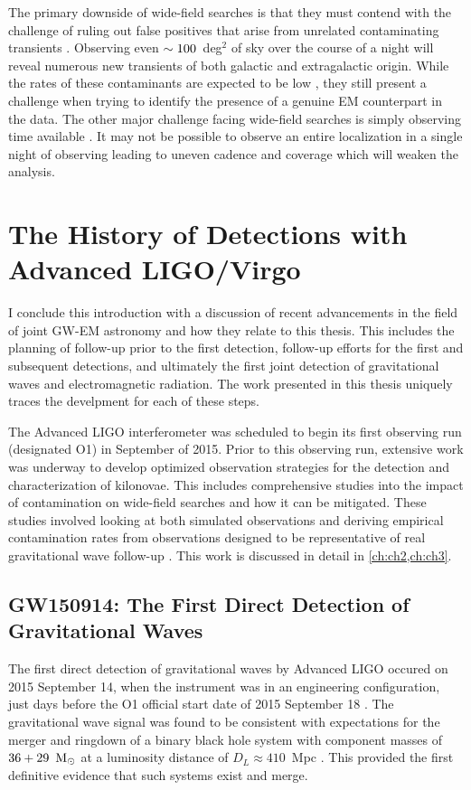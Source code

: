 The primary downside of wide-field searches is that they must contend with the challenge of ruling out false positives that arise from unrelated contaminating transients \citep{CowpBerger15}. Observing even $\sim100$~deg$^2$ of sky over the course of a night will reveal numerous new transients of both galactic and extragalactic origin. While the rates of these contaminants are expected to be low \citep[$\mathcal{R} \apx 2$ events per deg$^2$][]{Cowp+17}, they still present a challenge when trying to identify the presence of a genuine EM counterpart in the data. The other major challenge facing wide-field searches is simply observing time available \citep{CowpBerger15}. It may not be possible to observe an entire localization in a single night of observing leading to uneven cadence and coverage which will weaken the analysis.

\section{The History of Detections with Advanced LIGO/Virgo}
\label{sec:intro_history}
I conclude this introduction with a discussion of recent advancements in the field of joint GW-EM astronomy and how they relate to this thesis. This includes the planning of follow-up prior to the first detection, follow-up efforts for the first and subsequent detections, and ultimately the first joint detection of gravitational waves and electromagnetic radiation. The work presented in this thesis uniquely traces the develpment for each of these steps.

The Advanced LIGO interferometer was scheduled to begin its first observing run (designated O1) in September of 2015. Prior to this observing run, extensive work was underway to develop optimized observation strategies for the detection and characterization of kilonovae. This includes comprehensive studies into the impact of contamination on wide-field searches and how it can be mitigated. These studies involved looking at both simulated observations and deriving empirical contamination rates from observations designed to be representative of real gravitational wave follow-up \citep{CowpBerger15,Cowp+17b}. This work is discussed in detail in \cref{ch:ch2,ch:ch3}.

\subsection{GW150914: The First Direct Detection of Gravitational Waves}
\label{sec:intro_gw150914}
The first direct detection of gravitational waves by Advanced LIGO occured on 2015 September 14, when the instrument was in an engineering configuration, just days before the O1 official start date of 2015 September 18 \citep{LIGOGW150914}. The gravitational  wave signal was found to be consistent with expectations for the merger and ringdown of a binary black hole system with component masses of $36+29~{\rm\,M_\odot}$ at a luminosity distance of $D_L \approx 410$~Mpc \citep{LIGOGW150914}. This provided the first definitive evidence that such systems exist and merge.

